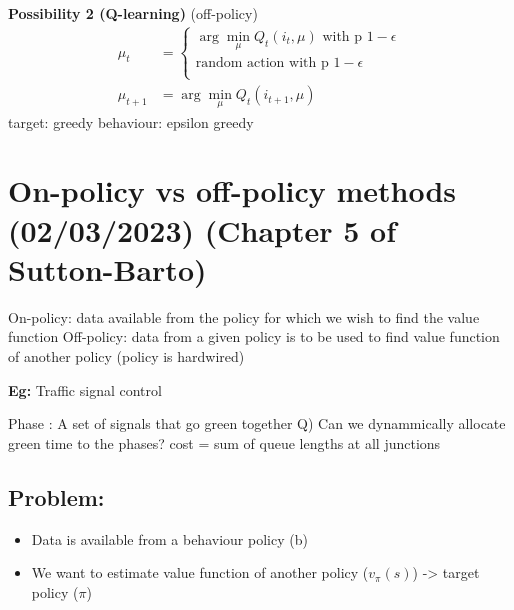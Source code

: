\documentclass[11pt]{article}
\begin{document}
\textbf{Possibility 2 (Q-learning)} (off-policy)
\begin{align*}
\mu_t &=
  \begin{cases}
    \arg\min_{\mu} Q_t(i_t, \mu) \text{ with p } 1-\epsilon \\
    \text{random action} \text{ with p } 1-\epsilon \\
  \end{cases} \\
\mu_{t+1} &= \arg\min_{\mu} Q_t(i_{t+1}, \mu)
\end{align*}
target: greedy
behaviour: epsilon greedy

\section{On-policy vs off-policy methods (02/03/2023) (Chapter 5 of Sutton-Barto)}
\label{sec:org3b57990}

On-policy: data available from the policy for which we wish to find the value function
Off-policy: data from a given policy is to be used to find value function of another policy (policy is hardwired)

\textbf{Eg:} Traffic signal control

Phase : A set of signals that go green together
Q) Can we dynammically allocate green time to the phases?
cost = sum of queue lengths at all junctions

\subsection{Problem:}
\label{sec:orgdb870fe}
\begin{itemize}
\item Data is available from a behaviour policy (b)
\item We want to estimate value function of another policy (\(v_{\pi}(s)\)) -> target policy (\(\pi\))
\end{itemize}
\end{document}
